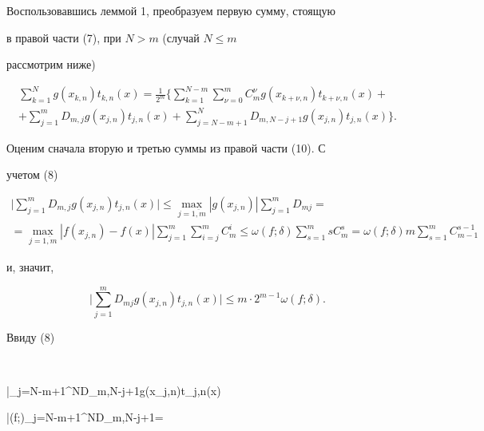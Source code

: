 Воспользовавшись леммой 1, преобразуем первую сумму, стоящую


в правой части (7), при $N>m$ (случай $N\le m$


рассмотрим ниже)


\begin{multline}


\sum_{k=1}^Ng(x_{k,n})t_{k,n}(x)=\frac1{2^m}\bigg\{


\sum_{k=1}^{N-m}\sum_{\nu=0}^mC_m^{\nu}g(x_{k+\nu,n})t_{k+


\nu,n}(x)+\\


%


+\sum_{j=1}^mD_{m,j}g(x_{j,n})t_{j,n}(x)+


\sum_{j=N-m+1}^ND_{m,N-j+1}g(x_{j,n})t_{j,n}(x)\bigg\}.


\end{multline}


Оценим сначала вторую и третью суммы из правой части (10). С 


учетом (8)


\begin{multline*}


\bigg|\sum_{j=1}^mD_{m,j}g(x_{j,n})t_{j,n}(x)


\bigg|\le\max_{j=\overline{1,m}}|g(x_{j,n})|\sum_{j=1}^m


D_{mj}= \\


%


=\max_{j=\overline{1,m}}|f(x_{j,n})-f(x)|


\sum_{j=1}^m\sum_{i=j}^mC_m^i\le\omega(f;\delta)\sum_{s=1}^m


sC_m^s=\omega(f;\delta)m\sum_{s=1}^mC_{m-1}^{s-1}


\end{multline*}


и, значит,


\begin{equation}


\bigg|\sum_{j=1}^mD_{mj}g(x_{j,n})t_{j,n}(x)\bigg|\le m\cdot 2^


{m-1}\omega(f;\delta).


\end{equation}


Ввиду (8)


$$


\bigg|\sum_{j=N-m+1}^ND_{m,N-j+1}g(x_{j,n})t_{j,n}(x)


\bigg|\le\omega(f;\delta)\sum_{j=N-m+1}^ND_{m,N-j+1}=


